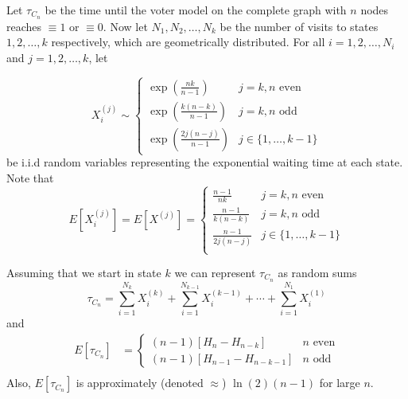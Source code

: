 \begin{theorem}
Let $\tau_{C_n}$ be the time until the voter model on the complete graph with $n$ nodes reaches $\equiv 1$ or $\equiv 0$.
Now let $N_1, N_2, \ldots, N_k$ be the number of visits to states $1, 2, \ldots, k$ respectively, which are geometrically distributed.
For all $i = 1,2,\ldots, N_i$ and $j = 1,2,\ldots, k$, let

$$
X_i^{(j)} \sim \begin{cases}
  \exp\left(\displaystyle \frac{nk}{n - 1}\right) & j = k, n \text{ even}\\[10pt]
  \exp\left(\displaystyle\frac{k (n - k)}{n - 1}\right) & j = k, n \text{ odd}\\[10pt]
  \exp\left(\displaystyle \frac{2j (n - j)}{n - 1}\right) & j \in \{1, \ldots, k-1\}
\end{cases}
$$
be i.i.d random variables representing the exponential waiting time at each state. Note that
$$
E[X_i^{(j)}] = E[X^{(j)}] = \begin{cases}
  \displaystyle \frac{n - 1}{nk} & j = k, n \text{ even}\\[10pt]
  \displaystyle \frac{n - 1}{k (n - k)} & j = k, n \text{ odd}\\[10pt]
  \displaystyle \frac{n - 1}{2j (n - j)} & j \in \{1,\ldots, k - 1\}\\
\end{cases}
$$

Assuming that we start in state $k$ we can represent $\tau_{C_n}$ as random sums
\begin{equation}\label{eq:wait_contact_sum_voter}
    \tau_{C_n} = \sum_{i = 1}^{N_k} X_i^{(k)} + \sum_{i = 1}^{N_{k - 1}} X_i^{(k - 1)} + \cdots + \sum_{i = 1}^{N_1} X_i^{(1)}
\end{equation}
and
\begin{align*}
E[\tau_{C_n}] &= \begin{cases}
    (n - 1) \left[H_{n} - H_{n - k}\right] & n \text{ even}\\
    (n - 1) \left[H_{n - 1} - H_{n - k - 1}\right] & n \text{ odd}
\end{cases}\\
\end{align*}
Also, $E[\tau_{C_n}]$ is approximately (denoted $\approx$) $\ln(2) (n - 1)$ for large $n$.
\end{theorem}

